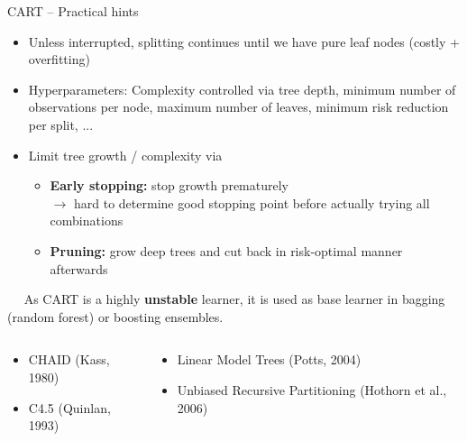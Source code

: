 \begin{frame}{CART -- Practical hints}

\footnotesize


\begin{itemize}
  \item Unless interrupted, splitting continues until we have pure leaf nodes (costly + overfitting)
  \item Hyperparameters: Complexity controlled via tree depth, minimum number of observations per node, maximum number of leaves, minimum risk reduction per split, ...
  \item Limit tree growth / complexity via
  \begin{itemize}
    \item \textbf{Early stopping:} stop growth prematurely \\ $\rightarrow$ hard 
    to determine good stopping point before actually trying all combinations
    \item \textbf{Pruning:} grow deep trees and cut back in risk-optimal manner afterwards
  \end{itemize}
\end{itemize}

\medskip

 ~~ 
As CART is a highly \textbf{unstable} learner, it is used as base learner in bagging (random forest) or boosting ensembles.

\medskip

\begin{columns}[T, totalwidth=\linewidth]
    \begin{column}{0.39\linewidth}
    \vspace{-\parsep}
        \begin{itemize}
\item CHAID (Kass, 1980)%
\item C4.5 (Quinlan, 1993)
\end{itemize}
    \end{column}
    \begin{column}{0.59\linewidth}
    \vspace{-\parsep}
        \begin{itemize}
\item Linear Model Trees (Potts, 2004)
\item Unbiased Recursive Partitioning (Hothorn et al., 2006)
\end{itemize}
    \end{column}
\end{columns}
   

\end{frame}
